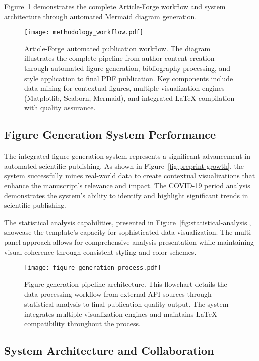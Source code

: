 Figure~\ref{fig:workflow} demonstrates the complete Article-Forge workflow and system architecture through automated Mermaid diagram generation.

\begin{figure}[htbp]
    \centering
    \texttt{[image: methodology\_workflow.pdf]}
    \caption{Article-Forge automated publication workflow. The diagram illustrates the complete pipeline from author content creation through automated figure generation, bibliography processing, and style application to final PDF publication. Key components include data mining for contextual figures, multiple visualization engines (Matplotlib, Seaborn, Mermaid), and integrated LaTeX compilation with quality assurance.}
    \label{fig:workflow}
\end{figure}

\subsection{Figure Generation System Performance}

The integrated figure generation system represents a significant advancement in automated scientific publishing. As shown in Figure~\ref{fig:preprint-growth}, the system successfully mines real-world data to create contextual visualizations that enhance the manuscript's relevance and impact. The COVID-19 period analysis demonstrates the system's ability to identify and highlight significant trends in scientific publishing.

The statistical analysis capabilities, presented in Figure~\ref{fig:statistical-analysis}, showcase the template's capacity for sophisticated data visualization. The multi-panel approach allows for comprehensive analysis presentation while maintaining visual coherence through consistent styling and color schemes.

\begin{figure}[htbp]
    \centering
    \texttt{[image: figure\_generation\_process.pdf]}
    \caption{Figure generation pipeline architecture. This flowchart details the data processing workflow from external API sources through statistical analysis to final publication-quality output. The system integrates multiple visualization engines and maintains LaTeX compatibility throughout the process.}
    \label{fig:figure-pipeline}
\end{figure}

\subsection{System Architecture and Collaboration}

